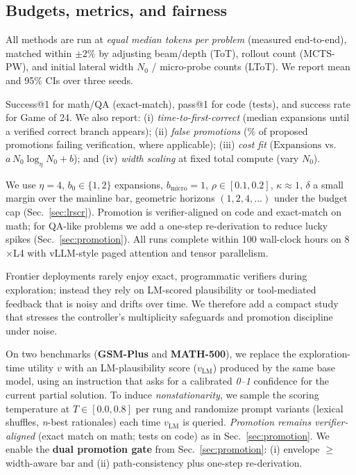 \documentclass{article}
\begin{document}
\subsection{Budgets, metrics, and fairness}
\label{subsec:budgets-metrics}
All methods are run at \emph{equal median tokens per problem} (measured end-to-end), matched within $\pm 2\%$ by adjusting beam/depth (ToT), rollout count (MCTS-PW), and initial lateral width $N_0$ / micro-probe counts (LToT).
We report mean and 95\% CIs over three seeds.

Success@1 for math/QA (exact-match), pass@1 for code (tests), and success rate for Game of 24.
We also report:
(i) \emph{time-to-first-correct} (median expansions until a verified correct branch appears);
(ii) \emph{false promotions} (\% of proposed promotions failing verification, where applicable);
(iii) \emph{cost fit} ($\mathrm{Expansions}$ vs.\ $a\,N_0\log_\eta N_0 + b$); and
(iv) \emph{width scaling} at fixed total compute (vary $N_0$).

We use $\eta{=}4$, $b_0{\in}\{1,2\}$ expansions, $b_{\text{micro}}{=}1$, $\rho{\in}[0.1,0.2]$, $\kappa{\approx}1$, $\delta$ a small margin over the mainline bar, geometric horizons $(1,2,4,\dots)$ under the budget cap (Sec.~\ref{sec:lrscr}).
Promotion is verifier-aligned on code and exact-match on math; for QA-like problems we add a one-step re-derivation to reduce lucky spikes (Sec.~\ref{sec:promotion}).
All runs complete within 100 wall-clock hours on 8$\times$L4 with vLLM-style paged attention and tensor parallelism.

Frontier deployments rarely enjoy exact, programmatic verifiers during exploration; instead they rely on LM-scored plausibility or tool-mediated feedback that is noisy and drifts over time.
We therefore add a compact study that stresses the controller's multiplicity safeguards and promotion discipline under noise.

On two benchmarks (\textbf{GSM-Plus} and \textbf{MATH-500}), we replace the exploration-time utility $v$ with an LM-plausibility score ($v_{\text{LM}}$) produced by the same base model, using an instruction that asks for a calibrated \emph{0--1} confidence for the current partial solution.
To induce \emph{nonstationarity}, we sample the scoring temperature at $T{\in}[0.0,0.8]$ per rung and randomize prompt variants (lexical shuffles, \emph{n}-best rationales) each time $v_{\text{LM}}$ is queried.
\emph{Promotion remains verifier-aligned} (exact match on math; tests on code) as in Sec.~\ref{sec:promotion}.
We enable the \textbf{dual promotion gate} from Sec.~\ref{sec:promotion}: (i) envelope $\ge$ width-aware bar and (ii) path-consistency plus one-step re-derivation.
\end{document}
